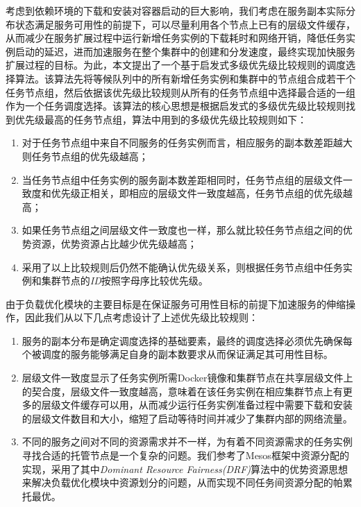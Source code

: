 考虑到依赖环境的下载和安装对容器启动的巨大影响，我们考虑在服务副本实际分布状态满足服务可用性的前提下，可以尽量利用各个节点上已有的层级文件缓存，从而减少在服务扩展过程中运行新增任务实例的下载耗时和网络开销，降低任务实例启动的延迟，进而加速服务在整个集群中的创建和分发速度，最终实现加快服务扩展过程的目标。为此，本文提出了一个基于启发式多级优先级比较规则的调度选择算法。该算法先将等候队列中的所有新增任务实例和集群中的节点组合成若干个任务节点组，然后依据该优先级比较规则从所有的任务节点组中选择最合适的一组作为一个任务调度选择。该算法的核心思想是根据启发式的多级优先级比较规则找到优先级最高的任务节点组，算法中用到的多级优先级比较规则如下：
\begin{enumerate}
\item 对于任务节点组中来自不同服务的任务实例而言，相应服务的副本数差距越大则任务节点组的优先级越高；
\item 当任务节点组中任务实例的服务副本数差距相同时，任务节点组的层级文件一致度和优先级正相关，即相应的层级文件一致度越高，任务节点组的优先级越高；
\item 如果任务节点组之间层级文件一致度也一样，那么就比较任务节点组之间的优势资源，优势资源占比越少优先级越高；
\item 采用了以上比较规则后仍然不能确认优先级关系，则根据任务节点组中任务实例和集群节点的\emph{ID}按照字母序比较优先级。
\end{enumerate}

由于负载优化模块的主要目标是在保证服务可用性目标的前提下加速服务的伸缩操作，因此我们从以下几点考虑设计了上述优先级比较规则：
\begin{enumerate}
\item 服务的副本分布是确定调度选择的基础要素，最终的调度选择必须优先确保每个被调度的服务能够满足自身的副本数要求从而保证满足其可用性目标。
\item 层级文件一致度显示了任务实例所需Docker镜像和集群节点在共享层级文件上的契合度，层级文件一致度越高，意味着在该任务实例在相应集群节点上有更多的层级文件缓存可以用，从而减少运行任务实例准备过程中需要下载和安装的层级文件数目和大小，缩短了启动等待时间并减少了集群内部的网络流量。
\item 不同的服务之间对不同的资源需求并不一样，为有着不同资源需求的任务实例寻找合适的托管节点是一个复杂的问题。我们参考了Mesos框架中资源分配的实现，采用了其中\emph{Dominant Resource Fairness(DRF)}算法中的优势资源思想来解决负载优化模块中资源划分的问题，从而实现不同任务间资源分配的帕累托最优\cite{ghodsi2011dominant}。
\end{enumerate}

